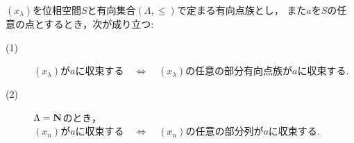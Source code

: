 	\begin{screen}
		\begin{thm}
		\label{thm:a_net_converges_iff_every_subnet_converges}
			$(x_\lambda)$を位相空間$S$と有向集合$(\Lambda,\leq)$で定まる有向点族とし，
			また$a$を$S$の任意の点とするとき，次が成り立つ:
			\begin{description}
				\item[(1)] $\mbox{$(x_\lambda)$が$a$に収束する}
					\quad \Longleftrightarrow \quad
					\mbox{$(x_\lambda)$の任意の部分有向点族が$a$に収束する}$.
					
				\item[(2)] $\Lambda = \mathbf{N}$のとき，
					$\mbox{$(x_n)$が$a$に収束する}
					\quad \Longleftrightarrow \quad
					\mbox{$(x_n)$の任意の部分列が$a$に収束する}$.
			\end{description}
		\end{thm}
	\end{screen}
	
